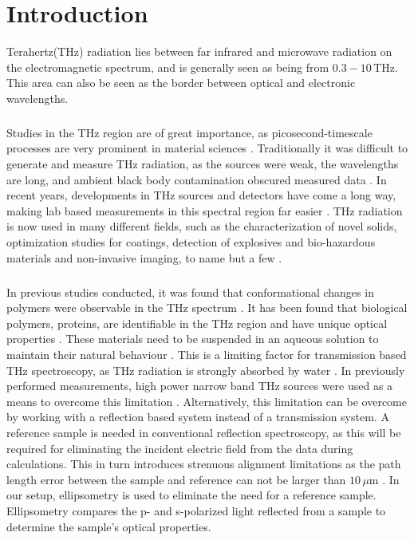 \chapter{Introduction}
\label{chp:Introduction}
Terahertz(THz) radiation lies between far infrared and microwave radiation on the electromagnetic spectrum, and is generally seen as being from $0.3 - 10\,$THz. This area can also be seen as the border between optical and electronic wavelengths.
\paragraph{}
Studies in the THz region are of great importance, as picosecond-timescale processes are very prominent in material sciences \cite{Xuequan2018, doi:10.1063/1.5004194, Neshat2013}.
Traditionally it was difficult to generate and measure THz radiation, as the sources were weak, the wavelengths are long, and ambient black body contamination obscured measured data \cite{Neshat2013}. In recent years, developments in THz sources and detectors have come a long way, making lab based measurements in this spectral region far easier \cite{Neshat2013}. THz radiation is now used in many different fields,  such as the characterization of novel solids, optimization studies for coatings, detection of explosives and bio-hazardous materials and non-invasive imaging, to name but a few \cite{Neshat2013}.
\paragraph{}
In previous studies conducted, it was found that conformational changes in polymers were observable in the THz spectrum \cite{Hoshina2010}.
It has been found that biological polymers, proteins, are identifiable in the THz region and have unique optical properties \cite{Xiaohui2018, Born2009, Novelli2017}. These materials need to be suspended in an aqueous solution to maintain their natural behaviour \cite{Xiaohui2018, Born2009, Novelli2017}. This is a limiting factor for transmission based THz spectroscopy, as THz radiation is strongly absorbed by water \cite{Wu-2018}. In previously performed measurements, high power narrow band THz sources were used as a means to overcome this limitation \cite{Xiaohui2018, Born2009, Novelli2017}.
Alternatively, this limitation can be overcome by working with a reflection based system instead of a transmission system. A reference sample is needed in conventional reflection spectroscopy, as this will be required for eliminating the incident electric field from the data during calculations. This in turn introduces strenuous alignment limitations as the path length error between the sample and reference can not be larger than $10\,\mu$m \cite{Naga}.
In our setup, ellipsometry is used to eliminate the need for a reference sample. Ellipsometry compares the p- and s-polarized light reflected from a sample to determine the sample's optical properties.

